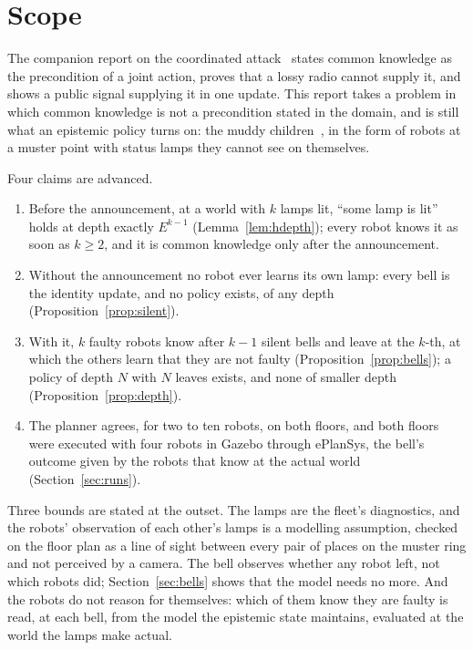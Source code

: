 \documentclass[11pt,a4paper]{article}
\theoremstyle{definition}
\begin{document}
\tableofcontents
\newpage

\section{Scope}
\label{sec:scope}

The companion report on the coordinated attack~\cite{ulises2026ca} states
common knowledge as the precondition of a joint action, proves that a lossy
radio cannot supply it, and shows a public signal supplying it in one update.
This report takes a problem in which common knowledge is not a precondition
stated in the domain, and is still what an epistemic policy turns on: the
muddy children~\cite{littlewood1953, mdh1986, fhmv1995}, in the form of robots
at a muster point with status lamps they cannot see on themselves.

Four claims are advanced.

\begin{enumerate}[leftmargin=1.4em, itemsep=2pt]
  \item Before the announcement, at a world with $k$ lamps lit, ``some lamp is
        lit'' holds at depth exactly $E^{k-1}$ (Lemma~\ref{lem:hdepth}); every
        robot knows it as soon as $k \geq 2$, and it is common knowledge only
        after the announcement.
  \item Without the announcement no robot ever learns its own lamp: every bell
        is the identity update, and no policy exists, of any depth
        (Proposition~\ref{prop:silent}).
  \item With it, $k$ faulty robots know after $k-1$ silent bells and leave at
        the $k$-th, at which the others learn that they are not faulty
        (Proposition~\ref{prop:bells}); a policy of depth $N$ with $N$ leaves
        exists, and none of smaller depth (Proposition~\ref{prop:depth}).
  \item The planner agrees, for two to ten robots, on both floors, and both
        floors were executed with four robots in Gazebo through ePlanSys, the
        bell's outcome given by the robots that know at the actual world
        (Section~\ref{sec:runs}).
\end{enumerate}

Three bounds are stated at the outset. The lamps are the fleet's diagnostics,
and the robots' observation of each other's lamps is a modelling assumption,
checked on the floor plan as a line of sight between every pair of places on
the muster ring and not perceived by a camera. The bell observes whether any
robot left, not which robots did; Section~\ref{sec:bells} shows that the model
needs no more. And the robots do not reason for themselves: which of them know
they are faulty is read, at each bell, from the model the epistemic state
maintains, evaluated at the world the lamps make actual.
\end{document}
